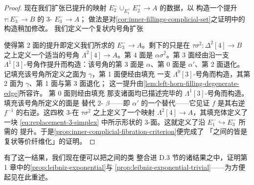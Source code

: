 \begin{proof}
现在我们扩张已提升的映射 $E_{2}^{-}\cup_{E_{1}^{+}}E_{2}^{+}\to A$ 的数据，以
构造一个提升 $\tau\colon E_{3}^{-}\to B$ 的 3-\trSimplex{} $E_{3}^{-}\to A$；
做法是对\cref{cor:inner-fillings-complicial-set}之证明中的构造稍加修改。
我们定义一个复状内号角扩张
\begin{center}
\end{center}
使得第 2 面的提升即定义我们所求的\trSimplex{} $E_{3}^{-}\to A$。剩下的只是在
$\tau\sigma^{2}\colon\Delta^{2}[4]\to B$ 之上定义一个适当的号角
$\Lambda^{2}[4]\to A$。第 4 面是 $\alpha\sigma^{2}$。第 3 面经由沿一支
$\Lambda^{1}[3]$-号角作提升而构造：该号角的第 3 面是 $\alpha$、第 0 面是
$\alpha'$、第 2 面退化。记填充该号角所定义之面为 $\gamma$，第 1 面便经由填充
一支 $\Lambda^{0}[3]$-号角而构造，其第 2 面为 $\gamma$、第 1 面与第 3 面退化；
这一提升由\cref{lem:left-horn-filling-degenerate-edge}所容许。
第 0 面则经由填充
那支诸面均已描述完毕的 $\Lambda^{1}[3]$-号角而构造。填充该号角所定义的面是
替代 2-\trSimplex{} $\beta$——即 $\alpha'$ 的一个替代——它见证 $f$ 是其右逆
$f^{-1}$ 的右逆。这四枚 3-\trSimplex{}在 $\tau\sigma^{2}$ 之上定义了一个映射
$\Lambda^{2}[4]\to A$，其填充体定义了一块
\eqref{eq:replacement-3-simplex} 中所示形状的
3-\trSimplex{}面。这就定义了沿 $E_{1}^{-}\hookrightarrow E_{3}^{-}$ 所需的
提升。于是\cref{prop:inner-complicial-fibration-criterion}便完成了
「\trQuasiCategory{}之间的\trIsofibration{}皆是复状等价纤维化」的证明。
\end{proof}

有了这一结果，我们现在便可以把\trQuasiCategory{}之间的\trIsofibration{}类
整合进 D.3 节的诸结果之中，证明第 1 章中的\cref{prop:leibniz-exponential}与
\cref{prop:leibniz-exponential-trivial}——为方便起见在此重述。

